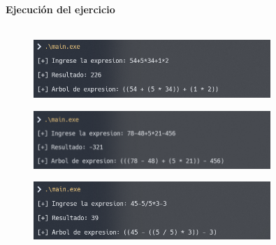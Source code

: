 \documentclass{article}
\begin{document}
        

        

        

        

        

        

        
        
        

        \textbf{Ejecución del ejercicio} \\\\
        \begin{figure}[H]
        	\centering
         	\includegraphics[width=0.8\textwidth,keepaspectratio]{img/ejercicio4_1.png}
        \end{figure}

        \begin{figure}[H]
        	\centering
         	\includegraphics[width=0.8\textwidth,keepaspectratio]{img/ejercicio4_2.png}
        \end{figure}

        \begin{figure}[H]
        	\centering
         	\includegraphics[width=0.8\textwidth,keepaspectratio]{img/ejercicio4_3.png}
        \end{figure}
\end{document}
